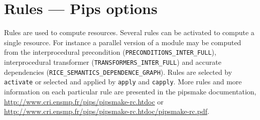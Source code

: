 \documentclass[a4paper]{article}
\newcommand{\PipsPIPSmakePDF}{\url{http://www.cri.ensmp.fr/pips/pipsmake-rc.htdoc/pipsmake-rc.pdf}\xspace}
\newcommand{\PipsPIPSmakeHTDOC}{\url{http://www.cri.ensmp.fr/pips/pipsmake-rc.htdoc}\xspace}
\begin{document}
\section{Rules --- Pips options}
\label{rules}

Rules are used to compute resources. Several rules can be activated to
compute a single resource. For instance a parallel version of a module may
be computed from the interprocedural precondition
(\verb+PRECONDITIONS_INTER_FULL+), interprocedural transformer
(\verb+TRANSFORMERS_INTER_FULL+) and accurate dependencies
(\verb+RICE_SEMANTICS_DEPENDENCE_GRAPH+). Rules are selected by
\verb+activate+ or selected and applied by \verb+apply+ and \verb+capply+.
More rules and more information on each particular rule are presented in
the pipsmake documentation, \PipsPIPSmakeHTDOC or \PipsPIPSmakePDF.
\end{document}
